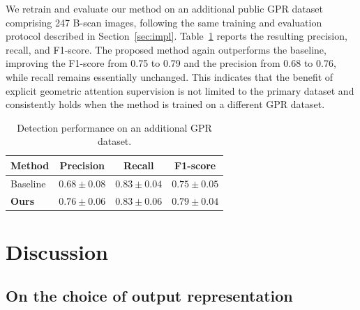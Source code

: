 \documentclass[lettersize,journal]{IEEEtran}
\begin{document}
We retrain and evaluate our method on an additional public GPR dataset
comprising 247 B-scan images, following the same training and evaluation
protocol described in Section~\ref{sec:impl}. Table~\ref{tab:generalization}
reports the resulting precision, recall, and F1-score. The proposed method again
outperforms the baseline, improving the F1-score from 0.75 to 0.79 and the
precision from 0.68 to 0.76, while recall remains essentially unchanged. This
indicates that the benefit of explicit geometric attention supervision is not
limited to the primary dataset and consistently holds when the method is trained
on a different GPR dataset.

\begin{table}[]
\caption{Detection performance on an additional GPR dataset.}
\label{tab:generalization}
\centering
\setlength{\tabcolsep}{4pt}
\begin{tabular}{lccc}
\toprule
Method & Precision & Recall & F1-score \\
\midrule
Baseline & $0.68 \pm 0.08$ & $0.83 \pm 0.04$ & $0.75 \pm 0.05$ \\
\textbf{Ours} & $\mathbf{0.76 \pm 0.06}$ & $0.83 \pm 0.06$ & $\mathbf{0.79 \pm
0.04}$ \\
\bottomrule
\end{tabular}
\end{table}

\section{Discussion}
\subsection{On the choice of output representation}

\end{document}
